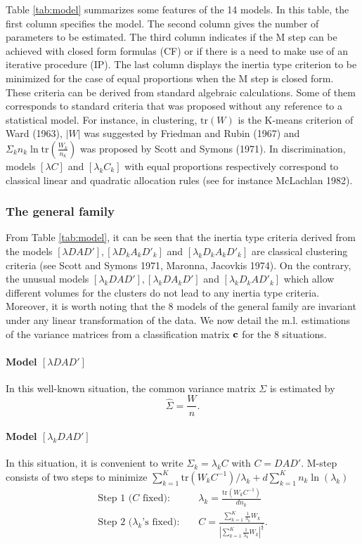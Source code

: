 \documentclass[12pt]{article}
\begin{document}
Table \ref{tab:model} summarizes some features of the 14 models.  In this table, the first
column specifies the model. The second column gives the number of parameters to be estimated.
The third column indicates if the M step can be achieved with closed form formulas (CF) or if
there is a need to make use of an iterative procedure (IP). The last column displays the
inertia type criterion to be minimized for the case of equal proportions when the M step is
closed form. These criteria can be derived from standard algebraic calculations. Some of them
corresponds to standard criteria that was proposed without any reference to a statistical
model. For instance, in clustering, $\mbox{tr}(W)$ is the K-means criterion of Ward (1963),
$|W|$ was suggested by Friedman and Rubin (1967) and $\Sigma_k n_k \ln \mbox{tr}
(\frac{W_k}{n_k})$ was proposed by Scott and Symons (1971). In discrimination, models $[\lambda
C]$ and $[\lambda_kC_k]$ with equal proportions respectively correspond to classical linear and
quadratic allocation rules (see for instance McLachlan 1982).


\subsubsection{The general family}
From Table \ref{tab:model}, it can be seen that the inertia type criteria derived from the
models $[\lambda DAD'], [\lambda D_kA_kD'_k]$ and $[\lambda_k D_kA_kD'_k]$ are classical
clustering criteria (see Scott and Symons 1971, Maronna, Jacovkis 1974). On the contrary, the
unusual models $[\lambda_k DAD'], [\lambda_k DA_kD']$ and $[\lambda_k D_kAD'_k]$ which allow
different volumes for the clusters do not lead to any inertia type criteria.  Moreover, it is
worth noting that the 8 models of the general family are invariant under any linear
transformation of the data.  We now detail the m.l. estimations of the variance matrices from a
classification matrix ${\bf c}$ for the 8 situations.


\paragraph{Model $[\lambda DAD']$}
In this well-known situation, the common variance matrix $\Sigma$ is estimated by
\begin{equation}
  \hat{\Sigma} = \frac{W}{n}.
\end{equation}
\paragraph{Model $[\lambda_{k} DAD']$}
In this situation, it is convenient to write $\Sigma_k=\lambda_k C$ with $C=DAD'$. M-step
consists of two steps to minimize $\sum_{k=1}^{K} \mbox{tr} ( W_k
C^{-1})/\lambda_k+ d\sum_{k=1}^{K} n_k \ln(\lambda_k)$
\begin{eqnarray}
  \mbox{Step 1 ($C$ fixed): } & &
  \lambda_k=\frac{\mbox{tr}(W_kC^{-1})}{d n_k} \\
  \mbox{Step 2 ($\lambda_k$'s fixed): } & &
  C=\frac{\sum_{k=1}^K\frac{1}{\lambda_k}W_k}{|\sum_{k=1}^K\frac{1}{\lambda_k}W_k|^{\frac{1}{d}}}.
\end{eqnarray}
\end{document}
